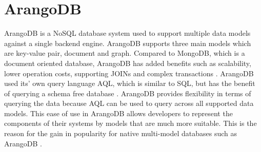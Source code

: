 \section{ArangoDB}

ArangoDB is a NoSQL database system used to support multiple data models against a single backend engine. ArangoDB supports three main models which are key-value pair, document and graph. Compared to MongoDB, which is a document oriented database, ArangoDB has added benefits such as scalability, lower operation costs, supporting JOINs and complex transactions \cite{hid-sp18-416-www-arangodb}. ArangoDB used its’ own query language AQL, which is similar to SQL, but has the benefit of querying a schema free database \cite{hid-sp18-416-www-aql-blog}. ArangoDB provides flexibility in terms of querying the data because AQL can be used to query across all supported data models. This ease of use in ArangoDB allows developers to represent the components of their systems by models that are much more suitable. This is the reason for the gain in popularity for native multi-model databases such as ArangoDB \cite{hid-sp18-416-www-graphdb-blog}.
